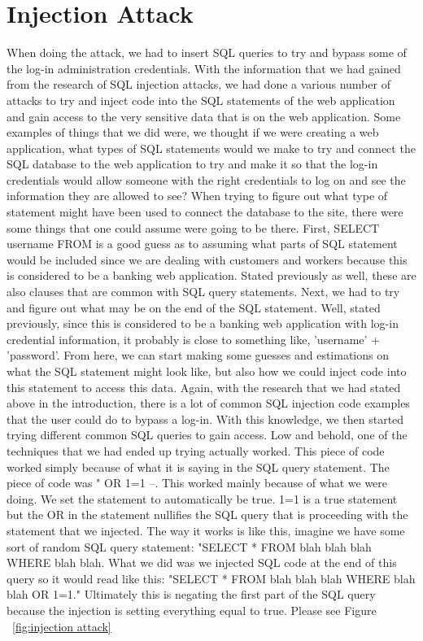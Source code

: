 \section{Injection Attack}
\label{sec:injection attack}


When doing the attack, we had to insert SQL queries to try and bypass some
of the log-in administration credentials. With the information that we had gained from
the research of SQL injection attacks, we had done a various number of attacks to try
and inject code into the SQL statements of the web application and gain access to the very sensitive
data that is on the web application. Some examples of things that we did were, we thought
if we were creating a web application, what types of SQL statements would we make to try
and connect the SQL database to the web application to try and make it so that the log-in
credentials would allow someone with the right credentials to log on and see the
information they are allowed to see? When trying to figure out what type of statement
might have been used to connect the database to the site, there were some things that
one could assume were going to be there. First, SELECT username FROM is a good guess as to assuming
what parts of SQL statement would be included since we are dealing with customers and workers
because this is considered to be a banking web application. Stated previously as well, these are also clauses that are common with SQL query statements. Next, we had to try and figure out what may
be on the end of the SQL statement. Well, stated previously, since this is considered to be a banking
web application with log-in credential information, it probably is close to something like, 'username' +
'password'. From here, we can start making some guesses and estimations on what the SQL statement
might look like, but also how we could inject code into this statement to access this data. Again, with the research that we had stated above in the introduction,
there is a lot of common SQL injection code examples that the user could do to bypass a log-in.
With this knowledge, we then started trying different common SQL queries to
gain access. Low and behold, one of the techniques that we had ended up trying actually
worked. This piece of code worked simply because of what it is saying in the SQL query statement. The piece of code was " OR 1=1 --. This worked mainly because of what we were doing. We set the statement to automatically be true. 1=1 is a true statement but the OR in the statement nullifies the SQL query that is proceeding with the statement that we injected. The way it works is like this, imagine we have some sort of random SQL query statement: "SELECT * FROM blah blah blah WHERE blah blah. What we did was we injected SQL code at the end of this query so it would read like this: "SELECT * FROM blah blah blah WHERE blah blah OR 1=1." Ultimately this is negating the first part of the SQL query because the injection is setting everything equal to true. Please see Figure ~\ref{fig:injection attack}

